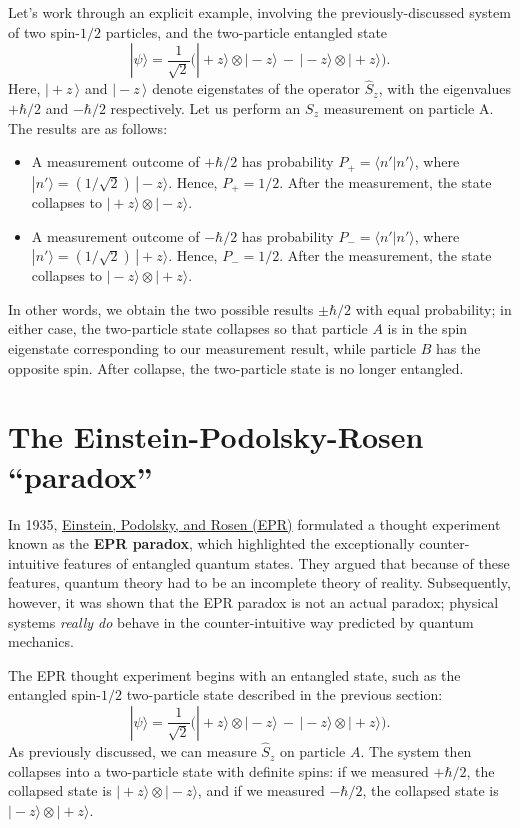 \documentclass[pra,11pt]{revtex4}
\begin{document}
Let's work through an explicit example, involving the
previously-discussed system of two spin-$1/2$ particles, and the
two-particle entangled state
$$|\psi\rangle = \frac{1}{\sqrt{2}} \Big(|\!+\!z\rangle\otimes|\!-\!z\rangle \,-\, |\!-\!z\rangle\otimes|\!+\!z\rangle\Big).$$
Here, $|\!+\!z\,\rangle$ and $|\!-\!z\,\rangle$ denote eigenstates
of the operator $\hat{S}_z$, with the eigenvalues $+\hbar/2$ and $-\hbar/2$
respectively.  Let us perform an $S_z$ measurement on particle A.  The
results are as follows:
\begin{itemize}
\item A measurement outcome of $+\hbar/2$ has probability $P_+ = \langle
  n'|n'\rangle$, where $|n'\rangle =
  (1/\sqrt{2})\,|\!-\!z\rangle$.  Hence, $P_+ = 1/2$.  After the
  measurement, the state collapses to $|\!+\!z\rangle
  \otimes|\!-\!z\rangle$.

\item A measurement outcome of $-\hbar/2$ has probability $P_- = \langle
  n'|n'\rangle$, where $|n'\rangle =
  (1/\sqrt{2})\,|\!+\!z\rangle$.  Hence, $P_- = 1/2$.  After the
  measurement, the state collapses to $|\!-\!z\rangle
  \otimes|\!+\!z\rangle$.
\end{itemize}
In other words, we obtain the two possible results $\pm \hbar/2$ with
equal probability; in either case, the two-particle state collapses so
that particle $A$ is in the spin eigenstate corresponding to our
measurement result, while particle $B$ has the opposite spin.  After
collapse, the two-particle state is no longer entangled.

\section{The Einstein-Podolsky-Rosen ``paradox''}

In 1935, \hyperref[cite:epr]{Einstein, Podolsky, and Rosen (EPR)}
formulated a thought experiment known as the \textbf{EPR paradox},
which highlighted the exceptionally counter-intuitive features of
entangled quantum states.  They argued that because of these features,
quantum theory had to be an incomplete theory of reality.
Subsequently, however, it was shown that the EPR paradox is not an
actual paradox; physical systems \textit{really do} behave in the
counter-intuitive way predicted by quantum mechanics.

The EPR thought experiment begins with an entangled state, such as the
entangled spin-$1/2$ two-particle state described in the previous section:
$$|\psi\rangle = \frac{1}{\sqrt{2}} \Big(|\!+\!z\rangle\otimes|\!-\!z\rangle \,-\, |\!-\!z\rangle\otimes|\!+\!z\rangle\Big).$$
As previously discussed, we can measure $\hat{S}_z$ on particle $A$.
The system then collapses into a two-particle state with definite
spins: if we measured $+\hbar/2$, the collapsed state is
$|\!+\!z\rangle \otimes|\!-\!z\rangle$, and if we measured $-\hbar/2$,
the collapsed state is $|\!-\!z\rangle\otimes|\!+\!z\rangle$.
\end{document}
